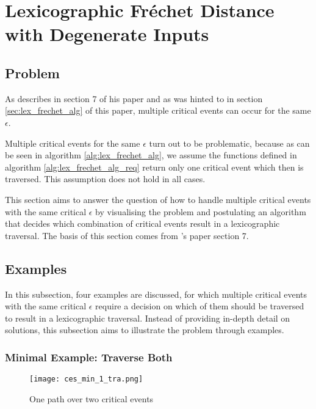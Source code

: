 
\section{Lexicographic Fréchet Distance with Degenerate Inputs}\label{lex_frechet_deg}

\subsection{Problem}

As \citeauthor{rotelex} describes in section 7 of his paper  and as was hinted to in section \ref{sec:lex_frechet_alg} of this paper, multiple critical events can occur for the same $\epsilon$.

Multiple critical events for the same $\epsilon$ turn out to be problematic, because as can be seen in algorithm \ref{alg:lex_frechet_alg}, we assume the functions defined in algorithm \ref{alg:lex_frechet_alg_req} return only one critical event which then is traversed. This assumption does not hold in all cases.

This section aims to answer the question of how to handle multiple critical events with the same critical $\epsilon$ by visualising the problem and postulating an algorithm that decides which combination of critical events result in a lexicographic traversal. The basis of this section comes from \citeauthor{rotelex}'s paper section 7\cite{rotelex}.


\subsection{Examples}

In this subsection, four examples are discussed, for which multiple critical events with the same critical $\epsilon$ require a decision on which of them should be traversed to result in a lexicographic traversal. Instead of providing in-depth detail on solutions, this subsection aims to illustrate the problem through examples.


\subsubsection{Minimal Example: Traverse Both}\label{sec:ces_min_1}

\begin{figure}[H]
    \centering
    
    \texttt{[image: ces\_min\_1\_tra.png]}
		
	\caption{One path over two critical events}
    \label{fig:ces_min_1}
\end{figure}

